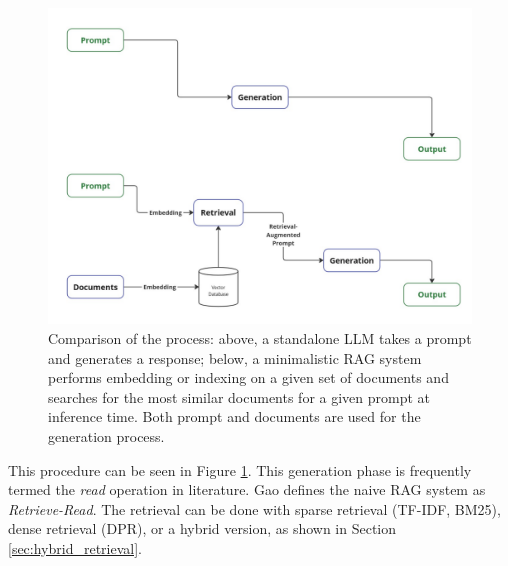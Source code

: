 \begin{figure}[h!]
    \centering
    \includegraphics[width=\textwidth]{images/LLM-vs-RAG.pdf}
    \caption{Comparison of the process: above, a standalone LLM takes a prompt and generates a response; below, a minimalistic RAG system performs embedding or indexing on a given set of documents and searches for the most similar documents for a given prompt at inference time. Both prompt and documents are used for the generation process.}
    \label{fig:naive_rag}
\end{figure}

This procedure can be seen in Figure \ref{fig:naive_rag}. This generation phase is frequently termed the \textit{read} operation in literature. Gao \cite{Gao.18.12.2023} defines the naive RAG system as \textit{Retrieve-Read}. The retrieval can be done with sparse retrieval (TF-IDF, BM25), dense retrieval (DPR), or a hybrid version, as shown in Section \ref{sec:hybrid_retrieval}. 

